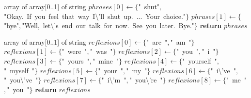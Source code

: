 \documentclass[a4paper,10pt]{article}
\begin{document}
\begin{algorithm}
\caption{setupGoodByePhrases(0)}
\begin{algorithmic}[5]
    \State array of array[0..1] of string
  \EndDecl
  \State \(phrases[0]\gets\{\)"{}\ shut"{}\(,\)"{}Okay.\ If\ you\ feel\ that\ way\ I\textbackslash{}'{}ll\ shut\ up.\ ...\ Your\ choice."{}\(\}\)
  \State \(phrases[1]\gets\{\)"{}bye"{}\(,\)"{}Well,\ let\textbackslash{}'{}s\ end\ our\ talk\ for\ now.\ See\ you\ later.\ Bye."{}\(\}\)
  \State \textbf{return} \(phrases\)
\EndFunction
\end{algorithmic}
\end{algorithm}


\begin{algorithm}
\caption{setupReflexions(0)}
\begin{algorithmic}[5]
\State {}
\State {}
\State {}
    \State array of array[0..1] of string
  \EndDecl
  \State \(reflexions[0]\gets\{\)"{}\ are\ "{}\(,\)"{}\ am\ "{}\(\}\)
  \State \(reflexions[1]\gets\{\)"{}\ were\ "{}\(,\)"{}\ was\ "{}\(\}\)
  \State \(reflexions[2]\gets\{\)"{}\ you\ "{}\(,\)"{}\ i\ "{}\(\}\)
  \State \(reflexions[3]\gets\{\)"{}\ yours\ "{}\(,\)"{}\ mine\ "{}\(\}\)
  \State \(reflexions[4]\gets\{\)"{}\ yourself\ "{}\(,\)"{}\ myself\ "{}\(\}\)
  \State \(reflexions[5]\gets\{\)"{}\ your\ "{}\(,\)"{}\ my\ "{}\(\}\)
  \State \(reflexions[6]\gets\{\)"{}\ i\textbackslash{}'{}ve\ "{}\(,\)"{}\ you\textbackslash{}'{}ve\ "{}\(\}\)
  \State \(reflexions[7]\gets\{\)"{}\ i\textbackslash{}'{}m\ "{}\(,\)"{}\ you\textbackslash{}'{}re\ "{}\(\}\)
  \State \(reflexions[8]\gets\{\)"{}\ me\ "{}\(,\)"{}\ \textbar{}you\ "{}\(\}\)
  \State \textbf{return} \(reflexions\)
\EndFunction
\end{algorithmic}
\end{algorithm}
\end{document}
